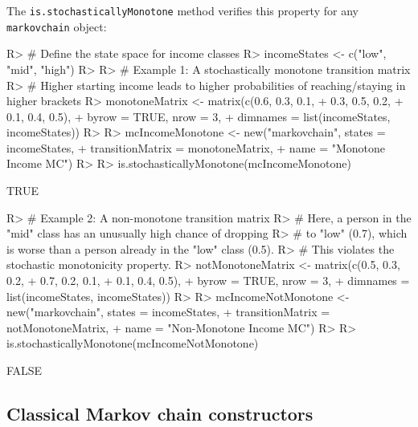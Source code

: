 \documentclass[
  nojss]{jss}
\begin{document}
The \texttt{is.stochasticallyMonotone} method verifies this property for any \texttt{markovchain} object:

\begin{CodeChunk}
\begin{CodeInput}
R> # Define the state space for income classes
R> incomeStates <- c("low", "mid", "high")
R> 
R> # Example 1: A stochastically monotone transition matrix
R> # Higher starting income leads to higher probabilities of reaching/staying in higher brackets
R> monotoneMatrix <- matrix(c(0.6, 0.3, 0.1,
+                            0.3, 0.5, 0.2,
+                            0.1, 0.4, 0.5), 
+                          byrow = TRUE, nrow = 3, 
+                          dimnames = list(incomeStates, incomeStates))
R> 
R> mcIncomeMonotone <- new("markovchain", states = incomeStates, 
+                         transitionMatrix = monotoneMatrix, 
+                         name = "Monotone Income MC")
R> 
R> is.stochasticallyMonotone(mcIncomeMonotone)
\end{CodeInput}
\begin{CodeOutput}
[1] TRUE
\end{CodeOutput}
\end{CodeChunk}

\begin{CodeChunk}
\begin{CodeInput}
R> # Example 2: A non-monotone transition matrix
R> # Here, a person in the "mid" class has an unusually high chance of dropping 
R> # to "low" (0.7), which is worse than a person already in the "low" class (0.5).
R> # This violates the stochastic monotonicity property.
R> notMonotoneMatrix <- matrix(c(0.5, 0.3, 0.2,
+                               0.7, 0.2, 0.1,
+                               0.1, 0.4, 0.5), 
+                             byrow = TRUE, nrow = 3, 
+                             dimnames = list(incomeStates, incomeStates))
R> 
R> mcIncomeNotMonotone <- new("markovchain", states = incomeStates, 
+                            transitionMatrix = notMonotoneMatrix, 
+                            name = "Non-Monotone Income MC")
R> 
R> is.stochasticallyMonotone(mcIncomeNotMonotone)
\end{CodeInput}
\begin{CodeOutput}
[1] FALSE
\end{CodeOutput}
\end{CodeChunk}

\subsection{Classical Markov chain constructors}\label{classical-markov-chain-constructors}
\end{document}
